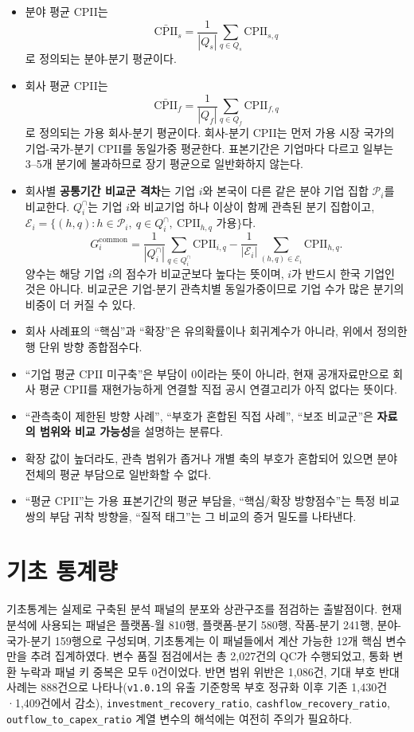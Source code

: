 \documentclass[11pt,a4paper]{report}
\begin{document}
\begin{itemize}[leftmargin=1.8em,itemsep=0.35em]
  \item 분야 평균 CPII는
  \[
  \bar{\mathrm{CPII}}_s
  =
  \frac{1}{|Q_s|}\sum_{q\in Q_s}\mathrm{CPII}_{s,q}
  \]
  로 정의되는 분야-분기 평균이다.
  \item 회사 평균 CPII는
  \[
  \bar{\mathrm{CPII}}_f
  =
  \frac{1}{|Q_f|}\sum_{q\in Q_f}\mathrm{CPII}_{f,q}
  \]
  로 정의되는 가용 회사-분기 평균이다. 회사-분기 CPII는 먼저 가용 시장 국가의 기업-국가-분기 CPII를 동일가중 평균한다. 표본기간은 기업마다 다르고 일부는 3--5개 분기에 불과하므로 장기 평균으로 일반화하지 않는다.
  \item 회사별 \textbf{공통기간 비교군 격차}는 기업 \(i\)와 본국이 다른 같은 분야 기업 집합 \(\mathcal P_i\)를 비교한다. \(Q_i^\cap\)는 기업 \(i\)와 비교기업 하나 이상이 함께 관측된 분기 집합이고, \(\mathcal E_i=\{(h,q):h\in\mathcal P_i,\ q\in Q_i^\cap,\ \mathrm{CPII}_{h,q}\text{ 가용}\}\)다.
  \[
  G_i^{\mathrm{common}}=
  \frac1{|Q_i^\cap|}\sum_{q\in Q_i^\cap}\mathrm{CPII}_{i,q}
  -\frac1{|\mathcal E_i|}\sum_{(h,q)\in\mathcal E_i}\mathrm{CPII}_{h,q}.
  \]
  양수는 해당 기업 \(i\)의 점수가 비교군보다 높다는 뜻이며, \(i\)가 반드시 한국 기업인 것은 아니다. 비교군은 기업-분기 관측치별 동일가중이므로 기업 수가 많은 분기의 비중이 더 커질 수 있다.
  \item 회사 사례표의 ``핵심''과 ``확장''은 유의확률이나 회귀계수가 아니라, 위에서 정의한 행 단위 방향 종합점수다.
  \item ``기업 평균 CPII 미구축''은 부담이 0이라는 뜻이 아니라, 현재 공개자료만으로 회사 평균 CPII를 재현가능하게 연결할 직접 공시 연결고리가 아직 없다는 뜻이다.
  \item ``관측축이 제한된 방향 사례'', ``부호가 혼합된 직접 사례'', ``보조 비교군''은 \textbf{자료의 범위와 비교 가능성}을 설명하는 분류다.
  \item 확장 값이 높더라도, 관측 범위가 좁거나 개별 축의 부호가 혼합되어 있으면 분야 전체의 평균 부담으로 일반화할 수 없다.
  \item ``평균 CPII''는 가용 표본기간의 평균 부담을, ``핵심/확장 방향점수''는 특정 비교쌍의 부담 귀착 방향을, ``질적 태그''는 그 비교의 증거 밀도를 나타낸다.
\end{itemize}

\section{기초 통계량}
기초통계는 실제로 구축된 분석 패널의 분포와 상관구조를 점검하는 출발점이다. 현재 분석에 사용되는 패널은 플랫폼-월 810행, 플랫폼-분기 580행, 작품-분기 241행, 분야-국가-분기 159행으로 구성되며, 기초통계는 이 패널들에서 계산 가능한 12개 핵심 변수만을 추려 집계하였다. 변수 품질 점검에서는 총 2,027건의 QC가 수행되었고, 통화 변환 누락과 패널 키 중복은 모두 0건이었다. 반면 범위 위반은 1,086건, 기대 부호 반대 사례는 888건으로 나타나(\texttt{v1.0.1}의 유출 기준항목 부호 정규화 이후 기존 1,430건·1,409건에서 감소), \texttt{investment\_recovery\_ratio}, \texttt{cashflow\_recovery\_ratio}, \texttt{outflow\_to\_capex\_ratio} 계열 변수의 해석에는 여전히 주의가 필요하다.
\end{document}
